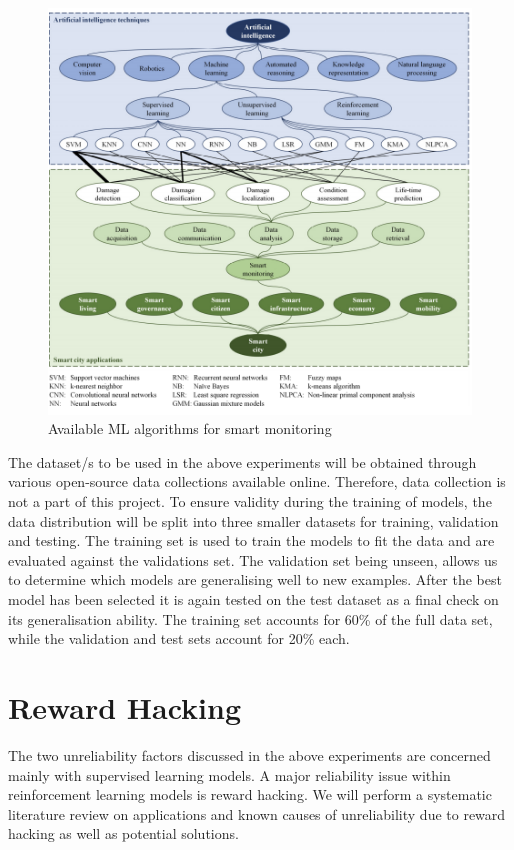 \documentclass[a4paper,12pt]{report}
\begin{document}
\begin{figure}[H]
    \centering
    \includegraphics[width=\textwidth]{smart_monitoring_algorithms.png}
    \caption{Available ML algorithms for smart monitoring \cite{inproceedings}}
    \label{fig:algor}
\end{figure}

\enlargethispage{\baselineskip}
The dataset/s to be used in the above experiments will be obtained through various open-source data collections available online. 
Therefore, data collection is not a part of this project.
To ensure validity during the training of models, the data distribution will be split into three smaller datasets for training, validation and testing. 
The training set is used to train the models to fit the data and are evaluated against the validations set. 
The validation set being unseen, allows us to determine which models are generalising well to new examples. 
After the best model has been selected it is again tested on the test dataset as a final check on its generalisation ability. 
The training set accounts for 60\% of the full data set, while the validation and test sets account for 20\% each. 

\section{Reward Hacking}
The two unreliability factors discussed in the above experiments are concerned mainly with supervised learning models. 
A major reliability issue within reinforcement learning models is reward hacking. 
We will perform a systematic literature review on applications and known causes of unreliability due to reward hacking as well as potential solutions.


\renewcommand{\bibname}{References}


\end{document}
